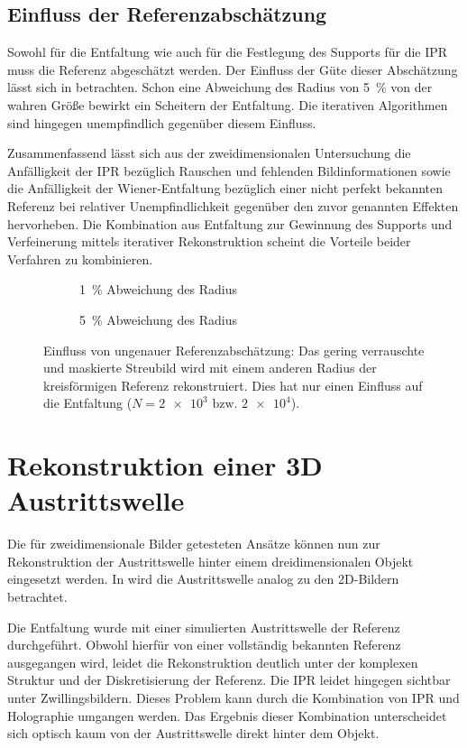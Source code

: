 \subsection{Einfluss der Referenzabschätzung}
Sowohl für die Entfaltung wie auch für die Festlegung des Supports für die IPR muss die Referenz abgeschätzt werden. Der Einfluss der Güte dieser Abschätzung lässt sich in  betrachten. Schon eine Abweichung des Radius von 5~\% von der wahren Größe bewirkt ein Scheitern der Entfaltung. Die iterativen Algorithmen sind hingegen unempfindlich gegenüber diesem Einfluss.

Zusammenfassend lässt sich aus der zweidimensionalen Untersuchung die Anfälligkeit der IPR bezüglich Rauschen und fehlenden Bildinformationen sowie die Anfälligkeit der Wiener-Entfaltung bezüglich einer nicht perfekt bekannten Referenz bei relativer Unempfindlichkeit gegenüber den zuvor genannten Effekten hervorheben. Die Kombination aus Entfaltung zur Gewinnung des Supports und Verfeinerung mittels iterativer Rekonstruktion scheint die Vorteile beider Verfahren zu kombinieren.
\begin{figure}
	\begin{subfigure}[b]{0.45\textwidth}
		\caption{1~\% Abweichung des Radius}
	\end{subfigure}
	\hspace*{\fill}
	\begin{subfigure}[b]{0.45\textwidth}
		\caption{5~\% Abweichung des Radius}	
	\end{subfigure}
	\caption[2D Rekonstruktion: Referenz]{Einfluss von ungenauer Referenzabschätzung: Das gering verrauschte und maskierte Streubild wird mit einem anderen Radius der kreisförmigen Referenz rekonstruiert. Dies hat nur einen Einfluss auf die Entfaltung ($N=\num{2e3} \text{ bzw. }\num{2e4}$).}
	\label{fig:recon2d-ref}
\end{figure}
 \clearpage
\section{Rekonstruktion einer 3D Austrittswelle}
Die für zweidimensionale Bilder getesteten Ansätze können nun zur Rekonstruktion der Austrittswelle hinter einem dreidimensionalen Objekt eingesetzt werden. In  wird die Austrittswelle analog zu den 2D-Bildern betrachtet.
	
Die Entfaltung wurde mit einer simulierten Austrittswelle der Referenz durchgeführt. Obwohl hierfür von einer vollständig bekannten Referenz ausgegangen wird, leidet die Rekonstruktion deutlich unter der komplexen Struktur und der Diskretisierung der Referenz. Die IPR leidet hingegen sichtbar unter Zwillingsbildern. Dieses Problem kann durch die Kombination von IPR und Holographie umgangen werden. Das Ergebnis dieser Kombination unterscheidet sich optisch kaum von der Austrittswelle direkt hinter dem Objekt.

